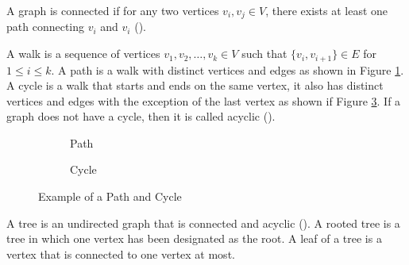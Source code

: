 A graph is connected if for any two vertices $v_i, v_j \in V$, there exists at least one path connecting $v_i$ and $v_i$ (\cite{diestel2024graph}).

A walk is a sequence of vertices $v_1, v_2, \ldots, v_k \in V$ such that $\{v_i, v_{i+1}\} \in E$ for $1 \le i \le k$. A path is a walk with distinct vertices and edges as shown in Figure \ref{fig:path}. A cycle is a walk that starts and ends on the same vertex, it also has distinct vertices and edges with the exception of the last vertex as shown if Figure \ref{fig:cycle}. If a graph does not have a cycle, then it is called acyclic (\cite{diestel2024graph}).

\begin{figure}[htb]
    \centering
    \begin{subfigure}{0.4\textwidth}
        \centering
        \caption{Path}
        \label{fig:path}
    \end{subfigure}
    \qquad
    \begin{subfigure}{0.4\textwidth}
        \centering
        \caption{Cycle}
        \label{fig:cycle}
    \end{subfigure}
    \caption{Example of a Path and Cycle}
\end{figure}

A tree is an undirected graph that is connected and acyclic (\cite{diestel2024graph}). A rooted tree is a tree in which one vertex has been designated as the root. A leaf of a tree is a vertex that is connected to one vertex at most.

